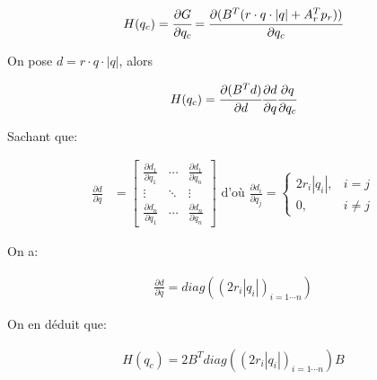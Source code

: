 \vspace{-1.5em}
\begin{align}
  H(q_c) = \cfrac{\partial G}{\partial q_c} = \cfrac{\partial (B^T(r \cdot q \cdot |q| + A_r^T p_r))}{\partial q_c}
\end{align}

On pose $d = r \cdot q \cdot |q|$, alors

\vspace{-1.5em}
\begin{align}
 H(q_c) = \cfrac{\partial (B^T d)}{\partial d} \cfrac{\partial d}{\partial q} \cfrac{\partial q}{\partial q_c} 
\end{align}

Sachant que:

\vspace{-1.5em}
\begin{align*}
  \frac{\partial d}{\partial q} &=
  \begin{bmatrix}
    \frac{\partial d_1}{\partial q_1} & \cdots & \frac{\partial d_1}{\partial q_n} \\
    \vdots & \ddots & \vdots \\
    \frac{\partial d_n}{\partial q_1} & \cdots & \frac{\partial d_n}{\partial q_n}
  \end{bmatrix} \mbox{\ \ \ d'où \ \ } \frac{\partial d_i}{\partial q_j} =
  \begin{cases} 
    2r_i|q_i|,  & i = j \\
    0, & i \ne j
  \end{cases}
\end{align*}

On a:

\vspace{-1.5em}
\begin{align}
  \frac{\partial d}{\partial q} = diag((2r_i|q_i|)_{i=1 \cdots n})
\end{align}

On en déduit que:

\vspace{-1.5em}
\begin{align}
 H(q_c) = 2B^T diag((2r_i|q_i|)_{i=1 \cdots n}) B 
\end{align}




              